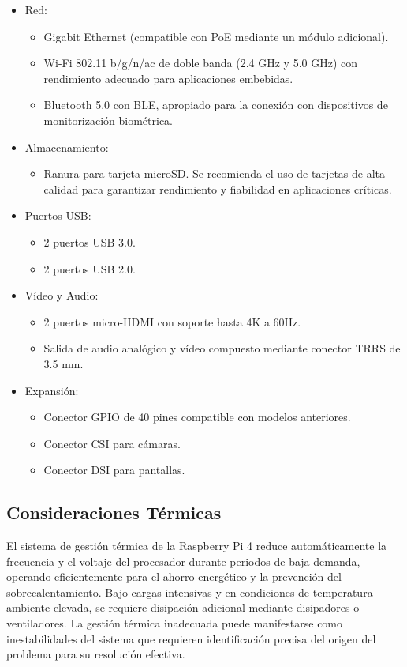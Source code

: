 \begin{itemize}
    \item Red:
    \begin{itemize}
        \item Gigabit Ethernet (compatible con PoE mediante un módulo adicional).
        \item Wi-Fi 802.11 b/g/n/ac de doble banda (2.4 GHz y 5.0 GHz) con rendimiento adecuado para aplicaciones embebidas.
        \item Bluetooth 5.0 con BLE, apropiado para la conexión con dispositivos de monitorización biométrica.
    \end{itemize}
    \item Almacenamiento:
    \begin{itemize}
        \item Ranura para tarjeta microSD. Se recomienda el uso de tarjetas de alta calidad para garantizar rendimiento y fiabilidad en aplicaciones críticas.
    \end{itemize}
    \item Puertos USB:
    \begin{itemize}
        \item 2 puertos USB 3.0.
        \item 2 puertos USB 2.0.
    \end{itemize}
    \item Vídeo y Audio:
    \begin{itemize}
        \item 2 puertos micro-HDMI con soporte hasta 4K a 60Hz.
        \item Salida de audio analógico y vídeo compuesto mediante conector TRRS de 3.5 mm.
    \end{itemize}
    \item Expansión:
    \begin{itemize}
        \item Conector GPIO de 40 pines compatible con modelos anteriores.
        \item Conector CSI para cámaras.
        \item Conector DSI para pantallas.
    \end{itemize}
\end{itemize}

\subsection{Consideraciones Térmicas}

El sistema de gestión térmica de la Raspberry Pi 4 reduce automáticamente la frecuencia y el voltaje del procesador durante periodos de baja demanda, operando eficientemente para el ahorro energético y la prevención del sobrecalentamiento. Bajo cargas intensivas y en condiciones de temperatura ambiente elevada, se requiere disipación adicional mediante disipadores o ventiladores. La gestión térmica inadecuada puede manifestarse como inestabilidades del sistema que requieren identificación precisa del origen del problema para su resolución efectiva.

